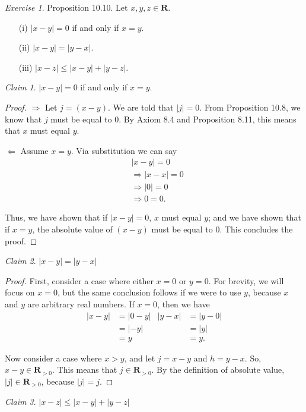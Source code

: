 \documentclass[12pt,oneside]{amsart}
\theoremstyle{remark}
\newtheorem{exer}{Exercise}
\newtheorem{claim}{Claim}[exer]
\newcommand{\bfR}{\mathbf{R}}
\begin{document}
%
%
%
%
\newpage
\begin{exer}
Proposition 10.10. Let $x, y, z \in \bfR$.
\begin{itemize}
  \item[ (i) ] $|x - y| = 0$ if and only if $x = y$.
  \item[ (ii) ] $|x - y| = |y - x|$.
  \item[ (iii) ] $|x - z| \leq |x - y| + |y - z|$.
\end{itemize}
\end{exer}
\begin{claim}
$|x - y| = 0$ if and only if $x = y$.
\end{claim}
\begin{proof}
$\Rightarrow$ Let $j = (x - y)$. We  are told that $|j| = 0$. From Proposition 10.8, we know that $j$ must be equal to 0. By Axiom 8.4 and Proposition 8.11, this means that $x$ must equal $y$.

$\Leftarrow$ Assume $x = y$. Via substitution we can say
\begin{equation}
\begin{split}
&            |x - y| = 0 \\
&\Rightarrow |x - x| = 0 \\
&\Rightarrow     |0| = 0 \\
&\Rightarrow       0 = 0.
\end{split}
\end{equation}

Thus, we have shown that if $|x - y| = 0$, $x$ must equal $y$; and we have shown that if $x = y$, the absolute value of $(x - y)$ must be equal to 0. This concludes the proof.
\end{proof}

\begin{claim}
$|x - y| = |y - x|$
\end{claim}
\begin{proof}
First, consider a case where either $x = 0$ or $y = 0$. For brevity, we will focus on $x = 0$, but the same conclusion follows if we were to use $y$, because $x$ and $y$ are arbitrary real numbers. If $x = 0$, then we have
\begin{align*}
|x - y| &= |0 - y|  &  |y - x| &= |y - 0| \\
        &= |-y|     &          &= |y| \\
        &= y        &          &= y.
\end{align*}

Now consider a case where $x > y$, and let $j = x - y$ and $h = y - x$. So, $x - y \in \bfR_{>0}$. This means that $j \in \bfR_{>0}$. By the definition of absolute value, $|j| \in \bfR_{>0}$, because $|j| = j$.
\end{proof}

\begin{claim}
$|x - z| \leq |x - y| + |y - z|$
\end{claim}
\end{document}
